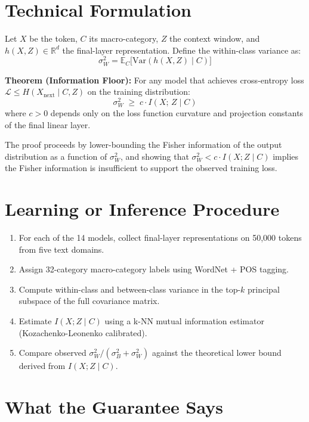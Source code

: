 \documentclass[10pt,twocolumn]{article}
\begin{document}
\section{Technical Formulation}

Let $X$ be the token, $C$ its macro-category, $Z$ the context window,
and $h(X, Z) \in \mathbb{R}^d$ the final-layer representation. Define
the within-class variance as:
\[
\sigma^2_W = \mathbb{E}_C \bigl[
  \mathrm{Var}(h(X, Z) \mid C)
\bigr]
\]

\textbf{Theorem (Information Floor):}
For any model that achieves cross-entropy loss
$\mathcal{L} \leq H(X_{\text{next}} \mid C, Z)$ on the training
distribution:
\[
\sigma^2_W \;\geq\; c \cdot I(X;\, Z \mid C)
\]
where $c > 0$ depends only on the loss function curvature and
projection constants of the final linear layer.

The proof proceeds by lower-bounding the Fisher information of the
output distribution as a function of $\sigma^2_W$, and showing that
$\sigma^2_W < c \cdot I(X; Z \mid C)$ implies the Fisher information
is insufficient to support the observed training loss.

\section{Learning or Inference Procedure}

\begin{enumerate}[itemsep=2pt,parsep=0pt]
  \item For each of the 14 models, collect final-layer representations
    on 50,000 tokens from five text domains.
  \item Assign 32-category macro-category labels using WordNet +
    POS tagging.
  \item Compute within-class and between-class variance in the
    top-$k$ principal subspace of the full covariance matrix.
  \item Estimate $I(X; Z \mid C)$ using a k-NN mutual information
    estimator (Kozachenko-Leonenko calibrated).
  \item Compare observed $\sigma^2_W / (\sigma^2_B + \sigma^2_W)$
    against the theoretical lower bound derived from $I(X; Z \mid C)$.
\end{enumerate}

\section{What the Guarantee Says}
\end{document}
